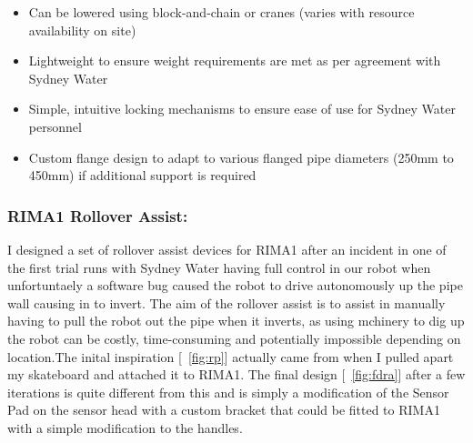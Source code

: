\begin{itemize}
    \item Can be lowered using block-and-chain or cranes (varies with resource availability on site)
    \item Lightweight to ensure weight requirements are met as per agreement with Sydney Water
    \item Simple, intuitive locking mechanisms to ensure ease of use for Sydney Water personnel
    \item Custom flange design to adapt to various flanged pipe diameters (250mm to 450mm) if additional support is required
\end{itemize}


\newpage
\subsubsection{RIMA1 Rollover Assist:}
I designed a set of rollover assist devices for RIMA1 after an incident in one of the first trial runs with Sydney Water having full control in our robot when unfortuntaely
a software bug caused the robot to drive autonomously up the pipe wall causing in to invert. The aim of the rollover assist is to assist in manually having to pull the robot out the pipe when it inverts, as 
using mchinery to dig up the robot can be costly, time-consuming and potentially impossible depending on location.The inital inspiration [~\ref{fig:rp}] actually came from when I pulled apart my skateboard and attached it to RIMA1.
The final design [~\ref{fig:fdra}] after a few iterations is quite different from this and is simply a modification of the Sensor Pad on the sensor head with a custom bracket that could be fitted to RIMA1 with a simple modification to the handles.  

